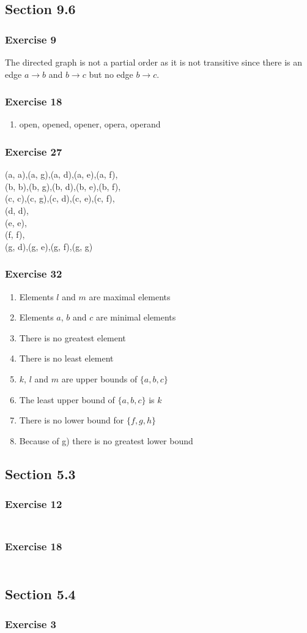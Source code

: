 \documentclass[a4paper]{article}
\newcommand{\ex}[1]{\subsubsection*{#1}}
\begin{document}
\pagestyle{fancy} %



\subsection*{Section 9.6}
\ex{Exercise 9}

The directed graph is not a partial order as it is not transitive since there
is an edge \(a \to b\) and \(b \to c\) but no edge \(b \to c\).


\ex{Exercise 18}

\begin{enumerate}[label=\alph*), start=2] 
    \item open, opened, opener, opera, operand
\end{enumerate}


\ex{Exercise 27} 

(a, a),(a, g),(a, d),(a, e),(a, f), \\
(b, b),(b, g),(b, d),(b, e),(b, f), \\
(c, c),(c, g),(c, d),(c, e),(c, f), \\
(d, d), \\
(e, e), \\
(f, f), \\
(g, d),(g, e),(g, f),(g, g)

\ex{Exercise 32}

\begin{enumerate}[label=-]
    \item Elements \(l\) and \(m\) are maximal elements
    \item Elements \(a\), \(b\) and \(c\) are minimal elements
    \item There is no greatest element
    \item There is no least element
    \item \(k\), \(l\) and \(m\) are upper bounds of \(\{a, b, c\}\)
    \item The least upper bound of \(\{a, b, c\}\) is \(k\)
    \item There is no lower bound for \(\{f, g, h\}\)
    \item Because of g) there is no greatest lower bound
\end{enumerate}

\subsection*{Section 5.3}
\ex{Exercise 12}

\begin{align}
\end{align}

\ex{Exercise 18}

\begin{align}
\end{align}



\subsection*{Section 5.4}
\ex{Exercise 3}


%
\end{document}
